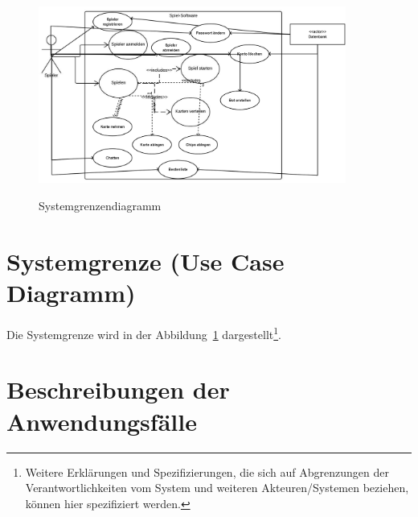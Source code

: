 \begin{figure}
\centering	
\includegraphics[width=0.9\textwidth]{img/ucd.png}
\label{fig:sys}
\caption{Systemgrenzendiagramm}
\end{figure}

\section{Systemgrenze (Use Case Diagramm)}

Die Systemgrenze wird in der Abbildung~\ref{fig:sys} dargestellt\footnote{Weitere Erklärungen und Spezifizierungen, die sich auf Abgrenzungen der Verantwortlichkeiten vom System und weiteren Akteuren/Systemen beziehen, können hier spezifiziert werden.}. 


\section{Beschreibungen der Anwendungsfälle}


\setcounter{uc}{10}

